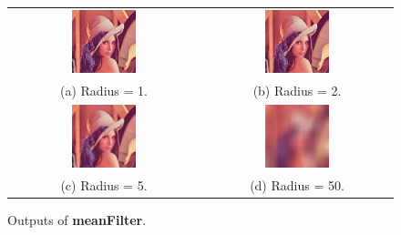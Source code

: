 \documentclass[english,a4paper,12pt,oneside]{article}
\begin{document}
    \begin {figure}[htb]
	\centering
	\begin{tabular}{cc}
		\includegraphics[width=0.35\textwidth]{lena_R1}&
		\includegraphics[width=0.35\textwidth]{lena_R2}\\
		(a) Radius = 1. & (b) Radius = 2.\\[1em]
		\includegraphics[width=0.35\textwidth]{lena_R5}&
		\includegraphics[width=0.35\textwidth]{lena_R50}\\
		(c) Radius = 5. & (d) Radius = 50.
	\end{tabular}
      \caption{\label{fig:boxFilter}Outputs of \textbf{meanFilter}.}
    \end {figure}
\end{document}
